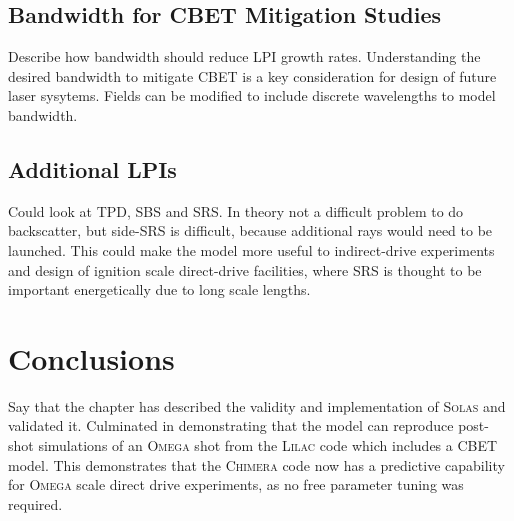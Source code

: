 \subsection{Bandwidth for CBET Mitigation Studies}

Describe how bandwidth should reduce LPI growth rates.
Understanding the desired bandwidth to mitigate CBET is a key consideration for design of future laser sysytems.
Fields can be modified to include discrete wavelengths to model bandwidth.

\subsection{Additional LPIs}

Could look at TPD, SBS and SRS.
In theory not a difficult problem to do backscatter, but side-SRS is difficult, because additional rays would need to be launched.
This could make the model more useful to indirect-drive experiments and design of ignition scale direct-drive facilities, where SRS is thought to be important energetically due to long scale lengths.



\section{Conclusions}

Say that the chapter has described the validity and implementation of \textsc{Solas} and validated it.
Culminated in demonstrating that the model can reproduce post-shot simulations of an \textsc{Omega} shot from the \textsc{Lilac} code which includes a CBET model.
This demonstrates that the \textsc{Chimera} code now has a predictive capability for \textsc{Omega} scale direct drive experiments, as no free parameter tuning was required.
